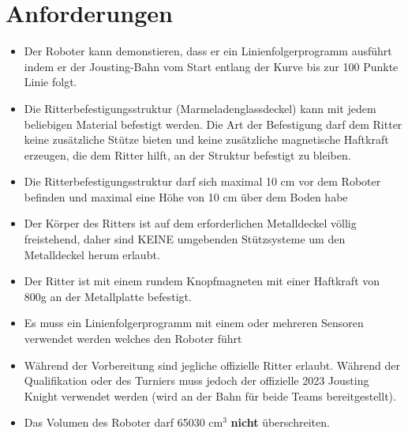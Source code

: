 \documentclass[a4paper,12pt]{article}
\begin{document}
\section{Anforderungen}
\robotRequirements
\begin{itemize}
	\item Der Roboter kann demonstieren, dass er ein Linienfolgerprogramm
		ausführt indem er der Jousting-Bahn vom Start entlang der
		Kurve bis zur 100 Punkte Linie folgt.
	\item Die Ritterbefestigungsstruktur (Marmeladenglassdeckel) kann mit
		jedem beliebigen Material befestigt werden. Die Art der
		Befestigung darf dem Ritter keine zusätzliche Stütze bieten und
		keine zusätzliche magnetische Haftkraft erzeugen, die dem
		Ritter hilft, an der Struktur befestigt zu bleiben.
	\item Die Ritterbefestigungsstruktur darf sich maximal 10 cm vor dem
		Roboter befinden und maximal eine Höhe von 10 cm über dem Boden
		habe
	\item Der Körper des Ritters ist auf dem erforderlichen Metalldeckel
		völlig freistehend, daher sind KEINE umgebenden Stützsysteme um
		den Metalldeckel herum erlaubt.
	\item Der Ritter ist mit einem rundem Knopfmagneten mit einer Haftkraft
		von 800g an der Metallplatte befestigt.
	\item Es muss ein Linienfolgerprogramm mit einem oder mehreren Sensoren
		verwendet werden welches den Roboter führt
	\item Während der Vorbereitung sind jegliche offizielle Ritter erlaubt.
		Während der Qualifikation oder des Turniers muss jedoch der
		offizielle 2023 Jousting Knight verwendet werden (wird an der
		Bahn für beide Teams bereitgestellt).
	\item Das Volumen des Roboter darf 65030 cm$^{3}$ \textbf{nicht}
		überschreiten.
\end{itemize}
\end{document}

